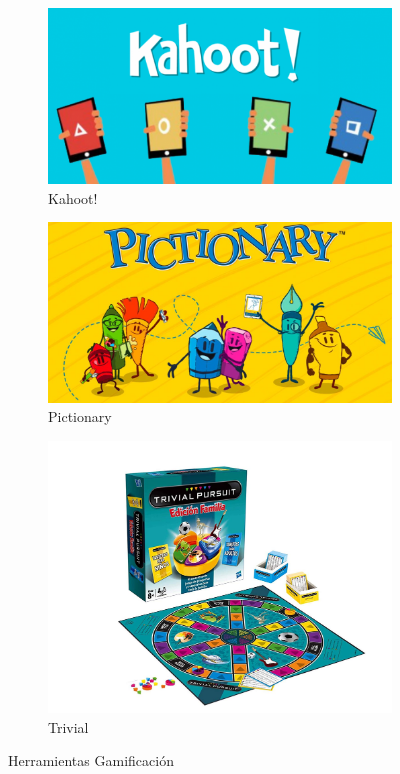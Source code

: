\documentclass[spanish,12pt, a4paper,twoside]{paper}
\begin{document}
\begin{figure}[h]
\centering
\begin{subfigure}[b]{0.3\textwidth}
\includegraphics[width=\textwidth]{recursos/kahoot.png}
\caption{Kahoot!}
\end{subfigure}
\begin{subfigure}[b]{0.3\textwidth}
\includegraphics[width=\textwidth]{recursos/pictionary-1200}
\caption{Pictionary}
\end{subfigure}
\begin{subfigure}[b]{0.3\textwidth}
\includegraphics[width=\textwidth]{recursos/trivial.jpg}
\caption{Trivial}
\end{subfigure}
\caption{Herramientas Gamificación}
\end{figure}
\end{document}
